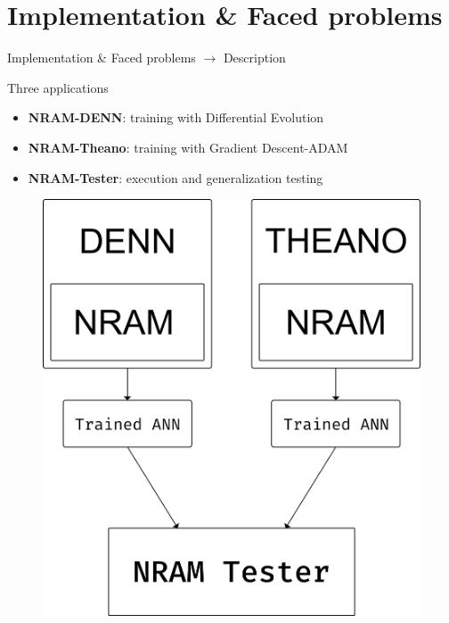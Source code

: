 \documentclass[xcolor={usenames}]{beamer}
\begin{document}
  \section{Implementation \& Faced problems}
  \begin{frame}{Implementation \& Faced problems \(\rightarrow\) Description}
  \begin{minipage}{0.58\textwidth}
  	Three applications 
  	\begin{itemize}
  		\item{\textbf{NRAM-DENN}: training with Differential Evolution}
  		\item{\textbf{NRAM-Theano}: training with Gradient Descent-ADAM}
  		\item{\textbf{NRAM-Tester}: execution and generalization testing}
  	\end{itemize}
  \end{minipage}
  \hfill
  \begin{minipage}{0.4\textwidth}
  	\begin{figure}
  		\centering
  		\includegraphics[width=\textwidth]{../figures/nram-implementation.png}
  	\end{figure}
  \end{minipage}	
  \end{frame}
\end{document}
